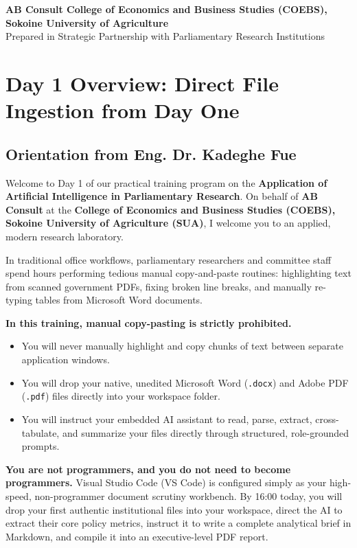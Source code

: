 \documentclass[11pt, a4paper]{report}
\begin{document}
\begin{titlepage}
    \vfill
    {\footnotesize \textbf{AB Consult \textbullet{} College of Economics and Business Studies (COEBS), Sokoine University of Agriculture}\\
    Prepared in Strategic Partnership with Parliamentary Research Institutions}
    \vspace*{0.2cm}
\end{titlepage}

\tableofcontents
\newpage

\chapter{Day 1 Overview: Direct File Ingestion from Day One}

\section{Orientation from Eng. Dr. Kadeghe Fue}
Welcome to Day 1 of our practical training program on the \textbf{Application of Artificial Intelligence in Parliamentary Research}. On behalf of \textbf{AB Consult} at the \textbf{College of Economics and Business Studies (COEBS), Sokoine University of Agriculture (SUA)}, I welcome you to an applied, modern research laboratory.

In traditional office workflows, parliamentary researchers and committee staff spend hours performing tedious manual copy-and-paste routines: highlighting text from scanned government PDFs, fixing broken line breaks, and manually re-typing tables from Microsoft Word documents. 

\textbf{In this training, manual copy-pasting is strictly prohibited.}
\begin{itemize}[label=-]
    \item You will never manually highlight and copy chunks of text between separate application windows.
    \item You will drop your native, unedited Microsoft Word (\texttt{.docx}) and Adobe PDF (\texttt{.pdf}) files directly into your workspace folder.
    \item You will instruct your embedded AI assistant to read, parse, extract, cross-tabulate, and summarize your files directly through structured, role-grounded prompts.
\end{itemize}

\textbf{You are not programmers, and you do not need to become programmers.} Visual Studio Code (VS Code) is configured simply as your high-speed, non-programmer document scrutiny workbench. By 16:00 today, you will drop your first authentic institutional files into your workspace, direct the AI to extract their core policy metrics, instruct it to write a complete analytical brief in Markdown, and compile it into an executive-level PDF report.
\end{document}
